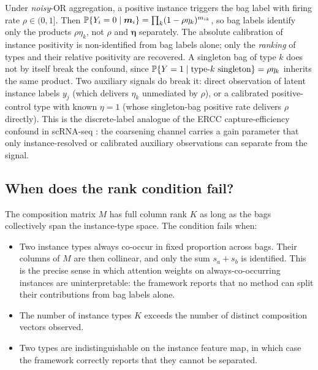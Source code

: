 \begin{remark}
\label{rem:firing-rate}
Under \emph{noisy}-OR aggregation, a positive instance triggers the
bag label with firing rate $\rho \in (0,1]$. Then
$\mathbb{P}\{Y_i = 0 \mid \bm{m}_i\} = \prod_k (1 - \rho\eta_k)^{m_{ik}}$,
so bag labels identify only the products $\rho\eta_k$, not $\rho$
and $\bm{\eta}$ separately. The absolute calibration of instance
positivity is non-identified from bag labels alone; only the
\emph{ranking} of types and their relative positivity are
recovered. A singleton bag of type $k$ does not by itself break the
confound, since
$\mathbb{P}\{Y = 1 \mid \text{type-}k\text{ singleton}\} = \rho\eta_k$
inherits the same product. Two auxiliary signals do break it:
direct observation of latent instance labels $y_j$ (which delivers
$\eta_k$ unmediated by $\rho$), or a calibrated positive-control
type with known $\eta = 1$ (whose singleton-bag positive rate
delivers $\rho$ directly). This is the discrete-label analogue of
the ERCC capture-efficiency confound in scRNA-seq
\citep{towell2026scrnacoarsening}: the coarsening channel carries a
gain parameter that only instance-resolved or calibrated auxiliary
observations can separate from the signal.
\end{remark}

\subsection{When does the rank condition fail?}

The composition matrix $M$ has full column rank $K$ as long as the
bags collectively span the instance-type space. The condition fails
when:
\begin{itemize}
\item Two instance types always co-occur in fixed proportion across
  bags. Their columns of $M$ are then collinear, and only the sum
  $s_a + s_b$ is identified. This is the precise sense in which
  attention weights on always-co-occurring instances are
  uninterpretable: the framework reports that no method can split
  their contributions from bag labels alone.
\item The number of instance types $K$ exceeds the number of
  distinct composition vectors observed.
\item Two types are indistinguishable on the instance feature map,
  in which case the framework correctly reports that they cannot be
  separated.
\end{itemize}

